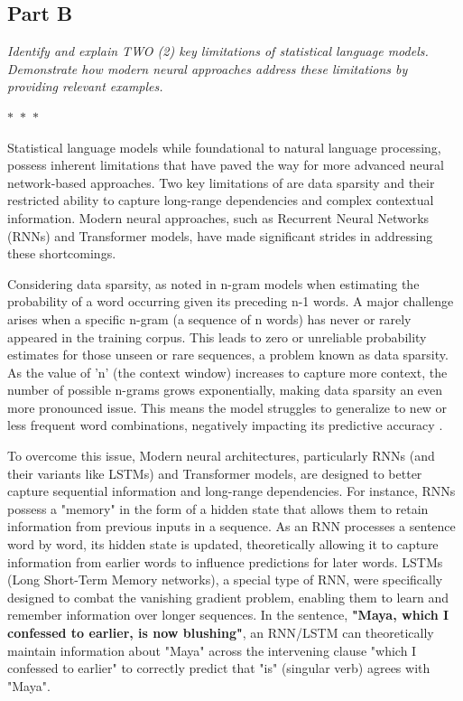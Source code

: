 \subsection*{Part B}

\textit{Identify and explain TWO (2) key limitations of statistical language models. Demonstrate how modern neural approaches address these limitations by providing relevant examples.}

\begin{center}
  $\ast$~$\ast$~$\ast$
\end{center}

Statistical language models while foundational to natural language processing, possess inherent limitations that have paved the way for more advanced neural network-based approaches. Two key limitations of are data sparsity and their restricted ability to capture long-range dependencies and complex contextual information. Modern neural approaches, such as Recurrent Neural Networks (RNNs) and Transformer models, have made significant strides in addressing these shortcomings.

Considering data sparsity, as noted in n-gram models when estimating the probability of a word occurring given its preceding n-1 words. A major challenge arises when a specific n-gram (a sequence of n words) has never or rarely appeared in the training corpus. This leads to zero or unreliable probability estimates for those unseen or rare sequences, a problem known as data sparsity. As the value of 'n' (the context window) increases to capture more context, the number of possible n-grams grows exponentially, making data sparsity an even more pronounced issue. This means the model struggles to generalize to new or less frequent word combinations, negatively impacting its predictive accuracy \parencite{dasgupta_hitgram_2024}.

To overcome this issue, Modern neural architectures, particularly RNNs (and their variants like LSTMs) and Transformer models, are designed to better capture sequential information and long-range dependencies. For instance, RNNs possess a "memory" in the form of a hidden state that allows them to retain information from previous inputs in a sequence. As an RNN processes a sentence word by word, its hidden state is updated, theoretically allowing it to capture information from earlier words to influence predictions for later words. LSTMs (Long Short-Term Memory networks), a special type of RNN, were specifically designed to combat the vanishing gradient problem, enabling them to learn and remember information over longer sequences. In the sentence, \textbf{"Maya, which I confessed to earlier, is now blushing"}, an RNN/LSTM can theoretically maintain information about "Maya" across the intervening clause "which I confessed to earlier" to correctly predict that "is" (singular verb) agrees with "Maya".

